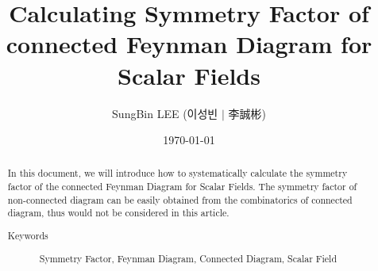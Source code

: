 \documentclass[%
 reprint,
 amsmath,amssymb,
 aps,
]{revtex4-2}
\numberwithin{equation}{section}
\begin{document}

\title{Calculating Symmetry Factor of connected Feynman Diagram 
for Scalar Fields}

\author{SungBin LEE (이성빈 $|$ 李誠彬)}





\date{\today}%

\begin{abstract}
In this document, we will introduce how to systematically calculate 
the symmetry factor of the connected Feynman Diagram for Scalar Fields. 
The symmetry factor of non-connected diagram can be easily obtained 
from the combinatorics of connected diagram, thus would not be considered 
in this article.

\begin{description}
\item[Keywords]
Symmetry Factor, Feynman Diagram, Connected Diagram, Scalar Field
\end{description}
\end{abstract}
\end{document}
